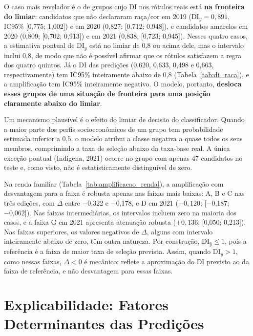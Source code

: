 O caso mais revelador é o de grupos cujo DI nos rótulos reais está \textbf{na fronteira do limiar}: candidatos que não declararam raça/cor em 2019 ($\mathrm{DI}_y = 0{,}891$, IC95\% [0,775; 1,002]) e em 2020 (0,827; [0,712; 0,948]), e candidatos amarelos em 2020 (0,809; [0,702; 0,913]) e em 2021 (0,838; [0,723; 0,945]). Nesses quatro casos, a estimativa pontual de $\mathrm{DI}_y$ está no limiar de 0,8 ou acima dele, mas o intervalo inclui 0,8, de modo que não é possível afirmar que os rótulos satisfazem a regra dos quatro quintos. Já o DI das predições (0,620, 0,633, 0,498 e 0,663, respectivamente) tem IC95\% inteiramente abaixo de 0,8 (Tabela~\ref{tab:di_raca}), e a amplificação tem IC95\% inteiramente negativo. O modelo, portanto, \textbf{desloca esses grupos de uma situação de fronteira para uma posição claramente abaixo do limiar}.

Um mecanismo plausível é o efeito do limiar de decisão do classificador. Quando a maior parte dos perfis socioeconômicos de um grupo tem probabilidade estimada inferior a 0,5, o modelo atribui a classe negativa a quase todos os seus membros, comprimindo a taxa de seleção abaixo da taxa-base real. A única exceção pontual (Indígena, 2021) ocorre no grupo com apenas 47 candidatos no teste e, como visto, não é estatisticamente distinguível de zero.

Na renda familiar (Tabela~\ref{tab:amplificacao_renda}), a amplificação com desvantagem para a faixa é robusta apenas nas faixas mais baixas: A, B e C nas três edições, com $\Delta$ entre −0,322 e −0,178, e D em 2021 ($-0{,}120$; [−0,187; −0,062]). Nas faixas intermediárias, os intervalos incluem zero na maioria dos casos, e a faixa G em 2021 apresenta atenuação robusta ($+0{,}136$; [0,050; 0,213]). Nas faixas superiores, os valores negativos de $\Delta$, alguns com intervalo inteiramente abaixo de zero, têm outra natureza. Por construção, $\mathrm{DI}_{\hat{y}} \leq 1$, pois a referência é a faixa de maior taxa de seleção prevista. Assim, quando $\mathrm{DI}_y > 1$, como nessas faixas, $\Delta < 0$ é mecânico: reflete a aproximação do DI previsto ao da faixa de referência, e não desvantagem para essas faixas.



\section{Explicabilidade: Fatores Determinantes das Predições}
\label{sec:res_shap}

